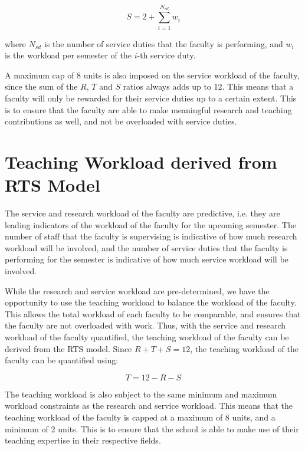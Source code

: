 \begin{equation}
  S = 2 + \sum_{i=1}^{N_{sd}} w_i
\end{equation}

where $N_{sd}$ is the number of service duties that the faculty is performing, and $w_i$ is the workload per semester of the $i$-th service duty.

A maximum cap of 8 units is also imposed on the service workload of the faculty, since the sum of the $R$, $T$ and $S$ ratios always adds up to 12. This means that a faculty will only be rewarded for their service duties up to a certain extent. This is to ensure that the faculty are able to make meaningful research and teaching contributions as well, and not be overloaded with service duties.

\section{Teaching Workload derived from RTS Model}

The service and research workload of the faculty are predictive, i.e. they are leading indicators of the workload of the faculty for the upcoming semester. The number of staff that the faculty is supervising is indicative of how much research workload will be involved, and the number of service duties that the faculty is performing for the semester is indicative of how much service workload will be involved.

While the research and service workload are pre-determined, we have the opportunity to use the teaching workload to balance the workload of the faculty. This allows the total workload of each faculty to be comparable, and ensures that the faculty are not overloaded with work. Thus, with the service and research workload of the faculty quantified, the teaching workload of the faculty can be derived from the RTS model. Since $R + T + S = 12$, the teaching workload of the faculty can be quantified using:

\begin{equation}
  T = 12 - R - S
\end{equation}

The teaching workload is also subject to the same minimum and maximum workload constraints as the research and service workload. This means that the teaching workload of the faculty is capped at a maximum of 8 units, and a minimum of 2 units. This is to ensure that the school is able to make use of their teaching expertise in their respective fields.


